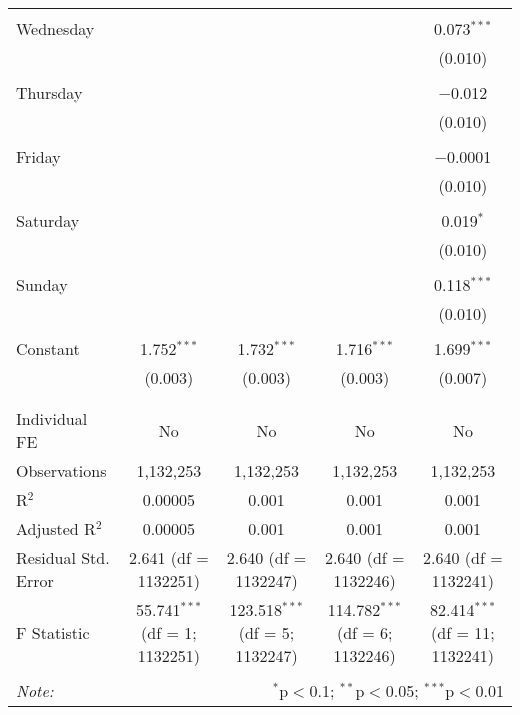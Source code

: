 \documentclass[
]{article}
\begin{document}
\begin{table}[!htbp]
{\begin{tabular}{@{\extracolsep{5pt}}lcccc}
  & & & & \\ 
 Wednesday &  &  &  & 0.073$^{***}$ \\ 
  &  &  &  & (0.010) \\ 
  & & & & \\ 
 Thursday &  &  &  & $-$0.012 \\ 
  &  &  &  & (0.010) \\ 
  & & & & \\ 
 Friday &  &  &  & $-$0.0001 \\ 
  &  &  &  & (0.010) \\ 
  & & & & \\ 
 Saturday &  &  &  & 0.019$^{*}$ \\ 
  &  &  &  & (0.010) \\ 
  & & & & \\ 
 Sunday &  &  &  & 0.118$^{***}$ \\ 
  &  &  &  & (0.010) \\ 
  & & & & \\ 
 Constant & 1.752$^{***}$ & 1.732$^{***}$ & 1.716$^{***}$ & 1.699$^{***}$ \\ 
  & (0.003) & (0.003) & (0.003) & (0.007) \\ 
  & & & & \\ 
\hline \\[-1.8ex] 
Individual FE & No & No & No & No \\ 
Observations & 1,132,253 & 1,132,253 & 1,132,253 & 1,132,253 \\ 
R$^{2}$ & 0.00005 & 0.001 & 0.001 & 0.001 \\ 
Adjusted R$^{2}$ & 0.00005 & 0.001 & 0.001 & 0.001 \\ 
Residual Std. Error & 2.641 (df = 1132251) & 2.640 (df = 1132247) & 2.640 (df = 1132246) & 2.640 (df = 1132241) \\ 
F Statistic & 55.741$^{***}$ (df = 1; 1132251) & 123.518$^{***}$ (df = 5; 1132247) & 114.782$^{***}$ (df = 6; 1132246) & 82.414$^{***}$ (df = 11; 1132241) \\ 
\hline 
\hline \\[-1.8ex] 
\textit{Note:}  & \multicolumn{4}{r}{$^{*}$p$<$0.1; $^{**}$p$<$0.05; $^{***}$p$<$0.01} \\ 
\end{tabular}
} 
\end{table} 
\newpage
\end{document}

